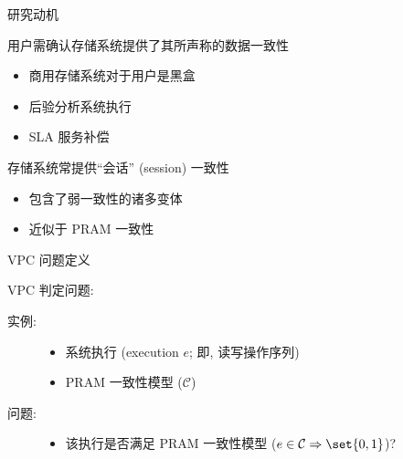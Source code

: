 \begin{frame}{研究动机}
  \vspace{0.50cm}

  \begin{description}
    \setlength{\itemsep}{5pt}
    \item[验证:] 用户需确认存储系统提供了其所声称的数据一致性  
      \begin{itemize}
        \item 商用存储系统对于用户是黑盒
        \item 后验分析系统执行
        \item SLA 服务补偿 
      \end{itemize}
    \item[PRAM:] 存储系统常提供``会话'' (session) 一致性 
       
      \begin{itemize}
	\item 包含了弱一致性的诸多变体 
	\item 近似于 PRAM 一致性  
      \end{itemize}
  \end{description}
\end{frame}


\begin{frame}{VPC 问题定义}
  \begin{cdefinition}
    VPC 判定问题:
    \begin{description}
      \item[实例:]
	\begin{itemize}
	  \item 系统执行 (execution $e$; 即, 读写操作序列)
	  \item PRAM 一致性模型 ($\mathcal{C}$)
	\end{itemize}
      \item[问题:]
        \begin{itemize}
          \item 该执行是否满足 PRAM 一致性模型 ($e \in \mathcal{C} \Rightarrow \set{0,1}$)?
        \end{itemize}
    \end{description}    
  \end{cdefinition}
\end{frame}


